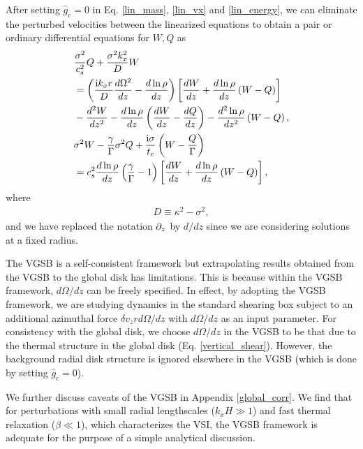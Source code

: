 After setting $\hat{g}_c=0$ in Eq. \ref{lin_mass}, \ref{lin_vx} and
\ref{lin_energy}, we can eliminate the perturbed velocities between
the linearized equations to obtain a pair or ordinary differential
equations for $W,Q$ as
\begin{align}
  &\frac{\sigma^2}{c_s^2}Q + \frac{\sigma^2k_x^2}{D}W \notag\\ 
  &=\left(\frac{\mathrm{i}
      k_x r}{D}\frac{d\Omega^2}{dz} -
    \frac{d\ln{\rho}}{dz}\right)\left[\frac{dW}{dz} +
    \frac{d\ln{\rho}}{dz}\left(W-Q\right)\right] \notag\\
  &- \frac{d^2W}{dz^2} - \frac{d\ln{\rho}}{dz}\left(\frac{dW}{dz} -
    \frac{dQ}{dz}\right) - \frac{d^2\ln{\rho}}{dz^2}\left(W-Q\right),\label{ode_w}\\
  &\sigma^2W - \frac{\gamma}{\Gamma}\sigma^2 Q +
  \frac{\mathrm{i}\sigma}{t_c}\left(W-\frac{Q}{\Gamma}\right)\notag\\
  &=c_s^2\frac{d\ln{\rho}}{dz}\left(\frac{\gamma}{\Gamma} - 1\right) 
  \left[\frac{dW}{dz} + \frac{d\ln{\rho}}{dz}\left(W-Q\right)\right],\label{ode_Q} 
\end{align}
where
\begin{align}
  D \equiv \kappa^2 - \sigma^2,
\end{align} 
and we have replaced the notation $\partial_z$ by $d/dz$ since we are
considering solutions at a fixed radius. 

The VGSB is a self-consistent framework but extrapolating results 
obtained from the VGSB to the global disk has limitations. This is
because within the VGSB framework, $d\Omega/dz$ can be freely
specified. In effect, by adopting the VGSB framework, we are studying
dynamics in the standard shearing box subject to an additional
azimuthal force $\delta v_zr d \Omega/dz$ with $d\Omega/dz$ as an
input parameter. For consistency with the global disk, we choose
$d\Omega/dz$ in the VGSB to be that due to the thermal structure in
the global disk (Eq. \ref{vertical_shear}). However, 
the background radial disk structure is ignored elsewhere in the VGSB
(which is done by setting $\hat{g}_c=0$).      

We further discuss caveats of the VGSB in Appendix \ref{global_corr}.
We find that for perturbations with small radial lengthscales
($k_xH\gg 1$) and fast thermal relaxation ($\beta\ll1$), which
characterizes the VSI, the VGSB framework is adequate for the purpose
of a simple analytical discussion. 

